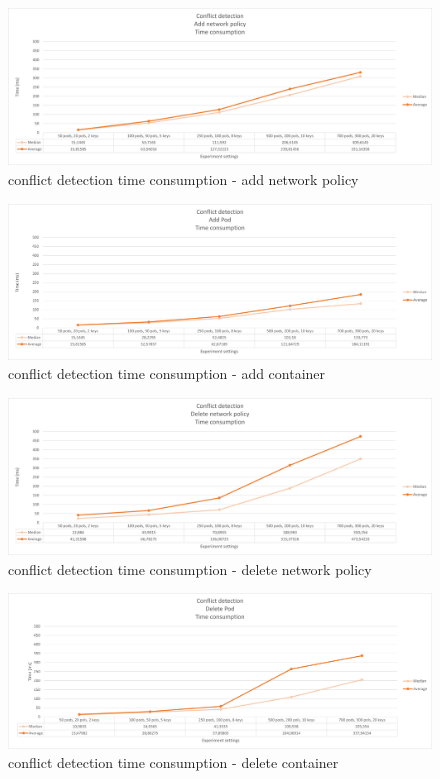 \begin{figure}[H]
    \centering
    \includegraphics[width=\textwidth]{images/experiment2/addNP-time-conflict.png}
    \caption{conflict detection time consumption - add network policy}
    \label{fig:exp2-addNP-time-conflict}
\end{figure}
\begin{figure}[H]
    \centering
    \includegraphics[width=\textwidth]{images/experiment2/addPod-time-conflict.png}
    \caption{conflict detection time consumption - add container}
    \label{fig:exp2-addPod-time-conflict}
\end{figure}
\begin{figure}[H]
    \centering
    \includegraphics[width=\textwidth]{images/experiment2/delNP-time-conflict.png}
    \caption{conflict detection time consumption - delete network policy}
    \label{fig:exp2-delNP-time-conflict}
\end{figure}
\begin{figure}[H]
    \centering
    \includegraphics[width=\textwidth]{images/experiment2/delPod-time-conflict.png}
    \caption{conflict detection time consumption - delete container}
    \label{fig:exp2-delPod-time-conflict}
\end{figure}



